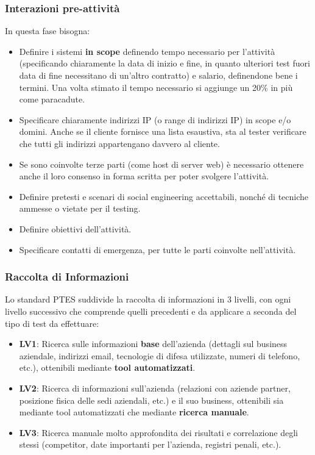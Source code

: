 \documentclass{article}
\begin{document}
\subsubsection{Interazioni pre-attività}
In questa fase bisogna:
\begin{itemize}
    \item Definire i sistemi \textbf{in scope} definendo tempo necessario per l'attività (specificando chiaramente la data di inizio e fine, in quanto ulteriori test fuori data di fine necessitano di un'altro contratto) e salario, definendone bene i termini. Una volta stimato il tempo necessario si aggiunge un 20\% in più come paracadute.

    \item  Specificare chiaramente indirizzi IP (o range di indirizzi IP) in scope e/o domini. Anche se il cliente fornisce una lista esaustiva, sta al tester verificare che tutti gli indirizzi appartengano davvero al cliente.
    
    \item Se sono coinvolte terze parti (come host di server web) è necessario ottenere anche il loro consenso in forma scritta per poter svolgere l’attività.

    \item Definire pretesti e scenari di social engineering accettabili, nonché di tecniche ammesse o vietate per il testing.
    
    \item Definire obiettivi dell’attività.
    
    \item Specificare contatti di emergenza, per tutte le parti coinvolte nell’attività.    
\end{itemize}

\subsubsection{Raccolta di Informazioni}
Lo standard PTES suddivide la raccolta di informazioni in 3 livelli, con ogni livello successivo che comprende quelli precedenti e da applicare a seconda del tipo di test da effettuare:
\begin{itemize}
    \item \textbf{LV1}: Ricerca sulle informazioni \textbf{base} dell'azienda (dettagli sul business aziendale, indirizzi email, tecnologie di difesa utilizzate, numeri di telefono, etc.), ottenibili mediante \textbf{tool automatizzati}.

    \item \textbf{LV2}: Ricerca di informazioni sull’azienda (relazioni con aziende partner, posizione fisica delle sedi aziendali, etc.) e il suo business, ottenibili sia mediante tool automatizzati che mediante \textbf{ricerca manuale}.

    \item \textbf{LV3}: Ricerca manuale molto approfondita dei risultati e correlazione degli stessi (competitor, date importanti per l’azienda, registri penali, etc.).
\end{itemize}
\end{document}
